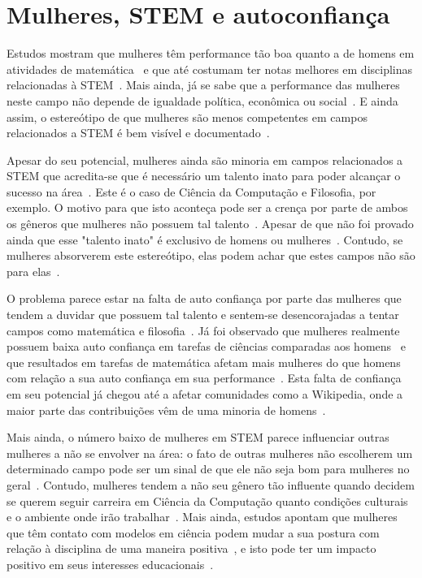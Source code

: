 \section{Mulheres, STEM e autoconfiança}
Estudos mostram que mulheres têm performance tão boa quanto a de homens em atividades de matemática~\cite{hyde1990gender,campbell1986effects} e que até costumam ter notas melhores em disciplinas relacionadas à STEM~\cite{stoet2015sex}. Mais ainda, já se sabe que a performance das mulheres neste campo não depende de igualdade política, econômica ou social~\cite{stoet2015sex}. E ainda assim, o estereótipo de que mulheres são menos competentes em campos relacionados a STEM é bem visível e documentado~\cite{moss2012science}.

Apesar do seu potencial, mulheres ainda são minoria em campos relacionados a STEM que acredita-se que é necessário um talento inato para poder alcançar o sucesso na área~\cite{leslie2015expectations}. Este é o caso de Ciência da Computação e Filosofia, por exemplo. O motivo para que isto aconteça pode ser a crença por parte de ambos os gêneros que mulheres não possuem tal talento~\cite{tiedemann2000gender,kirkcaldy2007parental}. Apesar de que não foi provado ainda que esse "talento inato" é exclusivo de homens ou mulheres~\cite{hyde2005gender}. Contudo, se mulheres absorverem este estereótipo, elas podem achar que estes campos não são para elas~\cite{wigfield2000expectancy,shapiro2011major}.

O problema parece estar na falta de auto confiança por parte das mulheres que tendem a duvidar que possuem tal talento e sentem-se desencorajadas a tentar campos como matemática e filosofia~\cite{leslie2015expectations}. Já foi observado que mulheres realmente possuem baixa auto confiança em tarefas de ciências comparadas aos homens~\cite{fox1992confidence} e que resultados em tarefas de matemática afetam mais mulheres do que homens com relação a sua auto confiança em sua performance~\cite{campbell1986effects}. Esta falta de confiança em seu potencial já chegou até a afetar comunidades como a Wikipedia, onde a maior parte das contribuições vêm de uma minoria de homens~\cite{antin2011gender,lam2011wp}.

Mais ainda, o número baixo de mulheres em STEM parece influenciar outras mulheres a não se envolver na área: o fato de outras mulheres não escolherem um determinado campo pode ser um sinal de que ele não seja bom para mulheres no geral~\cite{shapiro2011major}. Contudo, mulheres tendem a não seu gênero tão influente quando decidem se querem seguir carreira em Ciência da Computação quanto condições culturais e o ambiente onde irão trabalhar~\cite{blum2007cultural}. Mais ainda, estudos apontam que mulheres que têm contato com modelos em ciência podem mudar a sua postura com relação à disciplina de uma maneira positiva~\cite{smith1986effect}, e isto pode ter um impacto positivo em seus interesses educacionais~\cite{nixon1999educational}.

